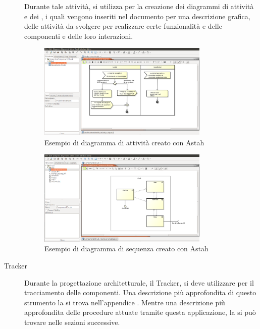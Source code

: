 				\begin{description}
					\item[] Durante tale attività, si utilizza  per la creazione dei diagrammi  di attività e dei , i quali vengono inseriti nel documento  per una descrizione grafica, delle attività da svolgere per realizzare certe funzionalità e delle componenti e delle loro interazioni. 
					\begin{figure}[H]
						\centering
						\includegraphics[width=0.8\textwidth]{NormeDiProgetto/Pics/AstahAttivita.png}
						\caption{Esempio di diagramma di attività creato con Astah}
					\end{figure}

					\begin{figure}[H]
					\centering
					\includegraphics[width=0.8\textwidth]{NormeDiProgetto/Pics/ComponentiAstah.png}
					\caption{Esempio di diagramma di sequenza creato con Astah}
				\end{figure}
					\item[Tracker] Durante la progettazione architetturale, il Tracker, si deve utilizzare per il tracciamento delle componenti. Una descrizione più approfondita di questo strumento la si trova nell'appendice . Mentre una descrizione più approfondita delle procedure attuate tramite questa applicazione, la si può trovare nelle sezioni successive.
				\end{description}
